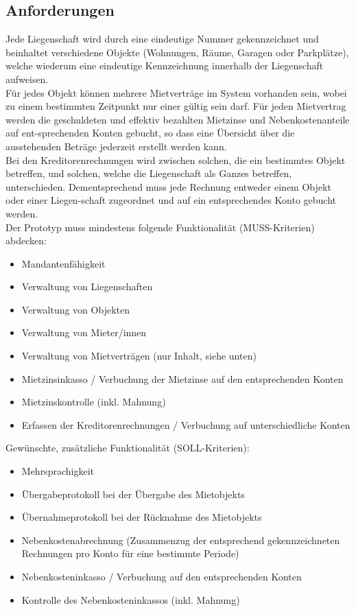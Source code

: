 \subsection{Anforderungen}
Jede Liegenschaft wird durch eine eindeutige Nummer gekennzeichnet und beinhaltet verschiedene Objekte (Wohnungen, Räume, Garagen oder Parkplätze), welche wiederum eine eindeutige Kennzeichnung innerhalb der Liegenschaft aufweisen.\\
Für jedes Objekt können mehrere Mietverträge im System vorhanden sein, wobei zu einem bestimmten Zeitpunkt nur einer gültig sein darf. Für jeden Mietvertrag werden die geschuldeten und effektiv bezahlten Mietzinse und Nebenkostenanteile auf ent-sprechenden Konten gebucht, so dass eine Übersicht über die ausstehenden Beträge jederzeit erstellt werden kann.\\
Bei den Kreditorenrechnungen wird zwischen solchen, die ein bestimmtes Objekt betreffen, und solchen, welche die Liegenschaft als Ganzes betreffen, unterschieden. Dementsprechend muss jede Rechnung entweder einem Objekt oder einer Liegen-schaft zugeordnet und auf ein entsprechendes Konto gebucht werden.\\
\newpage
Der Prototyp muss mindestens folgende Funktionalität (MUSS-Kriterien) abdecken:
\begin{itemize}
    \item Mandantenfähigkeit
    \item Verwaltung von Liegenschaften
    \item Verwaltung von Objekten
    \item Verwaltung von Mieter/innen
    \item Verwaltung von Mietverträgen (nur Inhalt, siehe unten)
    \item Mietzinsinkasso / Verbuchung der Mietzinse auf den entsprechenden Konten
    \item Mietzinskontrolle (inkl. Mahnung)
    \item Erfassen der Kreditorenrechnungen / Verbuchung auf unterschiedliche Konten
\end{itemize}

\vspace{3mm}
Gewünschte, zusätzliche Funktionalität (SOLL-Kriterien):
\begin{itemize}
    \item Mehrsprachigkeit
    \item Übergabeprotokoll bei der Übergabe des Mietobjekts
    \item Übernahmeprotokoll bei der Rücknahme des Mietobjekts
    \item Nebenkostenabrechnung (Zusammenzug der entsprechend gekennzeichneten Rechnungen pro Konto für eine bestimmte Periode)
    \item Nebenkosteninkasso / Verbuchung auf den entsprechenden Konten
    \item Kontrolle des Nebenkosteninkassos (inkl. Mahnung)
\end{itemize}

